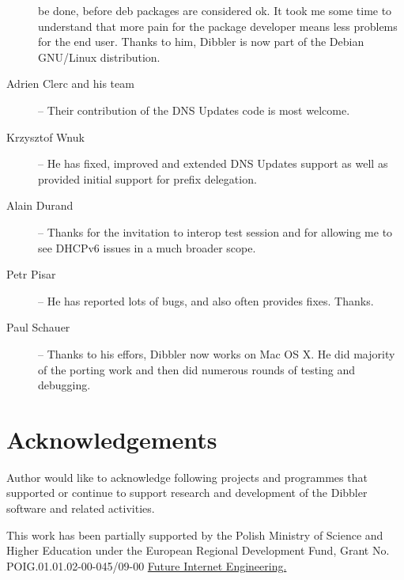 \begin{description}
  be done, before deb packages are considered ok. It took me some time
  to understand that more pain for the package developer means less
  problems for the end user.  Thanks to him, Dibbler is now part of
  the Debian GNU/Linux distribution.
\item[Adrien Clerc and his team] -- Their contribution of the DNS
  Updates code is most welcome.
\item[Krzysztof Wnuk] -- He has fixed, improved and extended DNS
  Updates support as well as provided initial support for prefix
  delegation.
\item[Alain Durand] -- Thanks for the invitation to interop test
  session and for allowing me to see DHCPv6 issues in a much broader
  scope.
\item[Petr Pisar] -- He has reported lots of bugs, and also often
  provides fixes.  Thanks.
\item[Paul Schauer] -- Thanks to his effors, Dibbler now works on Mac
  OS X. He did majority of the porting work and then did numerous
  rounds of testing and debugging.
\end{description}

\newpage
\section{Acknowledgements}
Author would like to acknowledge following projects and programmes
that supported or continue to support research and development of
the Dibbler software and related activities.

\vspace{1cm}

\noindent
This work has been partially supported by the Polish Ministry of
Science and Higher Education under the European Regional Development
Fund, Grant No. POIG.01.01.02-00-045/09-00 
\href{https://www.iip.net.pl/en/project}{Future Internet Engineering.}

